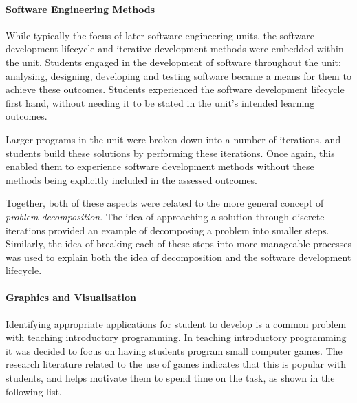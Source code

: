  
\paragraph{Software Engineering Methods} %
\label{par:software_engineering_methods}

While typically the focus of later software engineering units, the software development lifecycle and iterative development methods were embedded within the unit. Students engaged in the development of software throughout the unit: analysing, designing, developing and testing software became a means for them to achieve these outcomes. Students experienced the software development lifecycle first hand, without needing it to be stated in the unit's intended learning outcomes.

Larger programs in the unit were broken down into a number of iterations, and students build these solutions by performing these iterations. Once again, this enabled them to experience software development methods without these methods being explicitly included in the assessed outcomes.

Together, both of these aspects were related to the more general concept of \emph{problem decomposition}. The idea of approaching a solution through discrete iterations provided an example of decomposing a problem into smaller steps. Similarly, the idea of breaking each of these steps into more manageable processes was used to explain both the idea of decomposition and the software development lifecycle. 


\paragraph{Graphics and Visualisation} %
\label{par:graphics_and_visualisation}

Identifying appropriate applications for student to develop is a common problem with teaching introductory programming. In teaching introductory programming it was decided to focus on having students program small computer games. The research literature related to the use of games indicates that this is popular with students, and helps motivate them to spend time on the task, as shown in the following list.

